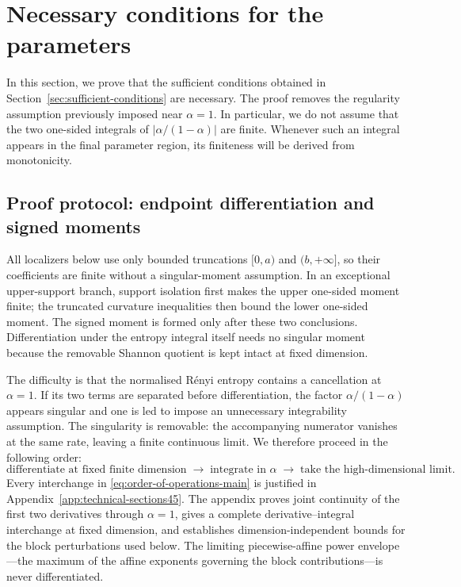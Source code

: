 \documentclass[aps,pra,11pt,onecolumn,nofootinbib,tightenlines]{revtex4-2}
\theoremstyle{definition}
\begin{document}
\section{Necessary conditions for the parameters}
\label{sec:necessary-conditions}

In this section, we prove that the sufficient conditions obtained in Section~\ref{sec:sufficient-conditions} are necessary. The proof removes the regularity assumption previously imposed near $\alpha=1$. In particular, we do not assume that the two one-sided integrals of $|\alpha/(1-\alpha)|$ are finite. Whenever such an integral appears in the final parameter region, its finiteness will be derived from monotonicity.

\subsection{Proof protocol: endpoint differentiation and signed moments}
\label{sec:necessity-protocol}

All localizers below use only bounded truncations $[0,a)$ and $(b,+\infty]$, so their coefficients are finite without a singular-moment assumption. In an exceptional upper-support branch, support isolation first makes the upper one-sided moment finite; the truncated curvature inequalities then bound the lower one-sided moment. The signed moment is formed only after these two conclusions. Differentiation under the entropy integral itself needs no singular moment because the removable Shannon quotient is kept intact at fixed dimension.

The difficulty is that the normalised R\'enyi entropy contains a cancellation at $\alpha=1$. If its two terms are separated before differentiation, the factor $\alpha/(1-\alpha)$ appears singular and one is led to impose an unnecessary integrability assumption.  The singularity is removable: the accompanying numerator vanishes at the same rate, leaving a finite continuous limit. We therefore proceed in the following order:
\begin{equation}
 \boxed{
 \text{differentiate at fixed finite dimension}
 \;\longrightarrow\;
 \text{integrate in }\alpha
 \;\longrightarrow\;
 \text{take the high-dimensional limit}.}
 \label{eq:order-of-operations-main}
\end{equation}
Every interchange in \eqref{eq:order-of-operations-main} is justified in Appendix~\ref{app:technical-sections45}. The appendix proves joint continuity of the first two derivatives through $\alpha=1$, gives a complete derivative--integral interchange at fixed dimension, and establishes dimension-independent bounds for the block perturbations used below. The limiting piecewise-affine power envelope---the maximum of the affine exponents governing the block contributions---is never differentiated.
\end{document}
